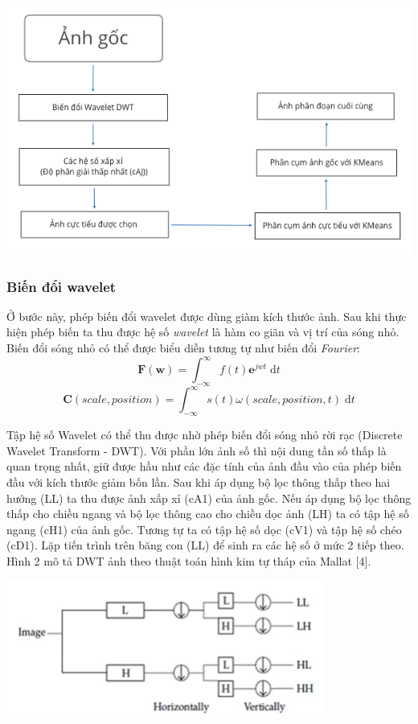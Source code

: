 \documentclass[12pt,a4paper]{article}
\begin{document}
\begin{center}
\includegraphics[scale=0.6]{wikmeans.png}
\end{center}

\subsubsection{Biến đổi wavelet}
Ở bước này, phép biến đổi wavelet được dùng giàm kích thước ảnh. Sau khi thực hiện phép biến ta thu được hệ số \textit{wavelet} là hàm co giãn và vị trí của sóng nhỏ. Biến đổi sóng nhỏ có thể được biểu diễn tương tự như biến đổi \textit{Fourier}:$$\mathbf{F(w)} = \int_{-\infty}^\infty f(t) \mathbf{e}^{jwt} \;\mathrm{d}t $$
$$\mathbf{C}(scale,position) = \int_{-\infty}^\infty s(t) \omega (scale,position,t) \;\mathrm{d}t $$

Tập hệ số Wavelet có thể thu được nhờ phép biến đổi sóng nhỏ rời rạc (Discrete Wavelet Transform - DWT). Với phần lớn ảnh số thì nội dung tần số thấp là quan trọng nhất, giữ được hầu như các đặc tính của ảnh đầu vào của phép biến đầu với kích thước giảm bốn lần. Sau khi áp dụng bộ lọc thông thấp theo hai hướng (LL) ta thu được ảnh xấp xỉ (cA1) của ảnh gốc. Nếu áp dụng bộ lọc thông thấp cho chiều ngang và bộ lọc thông cao cho chiều dọc ảnh (LH) ta có tập hệ số ngang (cH1) của ảnh gốc. Tương tự ta có tập hệ số dọc (cV1) và tập hệ số chéo (cD1). Lặp tiến trình trên băng con (LL) để sinh ra các hệ số ở mức 2 tiếp theo. Hình 2 mô tả DWT ảnh theo thuật toán hình kim tự tháp của Mallat [4].

\begin{center}
\includegraphics[scale=0.7]{biendoianhwave.png}
\end{center}
\end{document}
